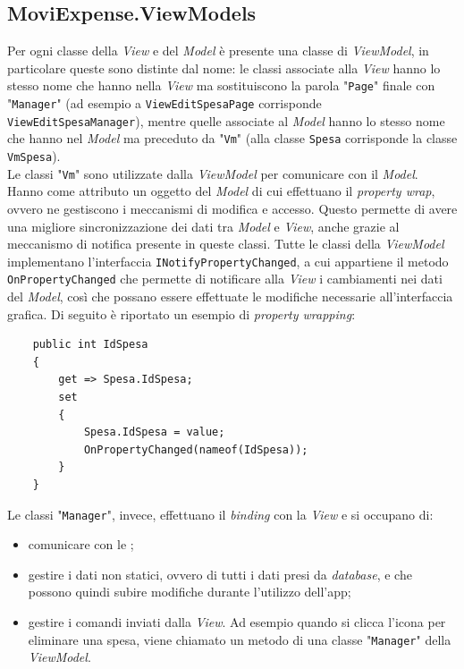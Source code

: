 \subsection{MoviExpense.ViewModels}

Per ogni classe della \textit{View} e del \textit{Model} è presente una classe di \textit{ViewModel}, in particolare queste sono distinte dal nome: le classi associate alla \textit{View} hanno lo stesso nome che hanno nella \textit{View} ma sostituiscono la parola "\texttt{Page}" finale con "\texttt{Manager}" (ad esempio a \texttt{ViewEditSpesaPage} corrisponde \texttt{ViewEditSpesaManager}), mentre quelle associate al \textit{Model} hanno lo stesso nome che hanno nel \textit{Model} ma preceduto da "\texttt{Vm}" (alla classe \texttt{Spesa} corrisponde la classe \texttt{VmSpesa}).\\
Le classi "\texttt{Vm}" sono utilizzate dalla \textit{ViewModel} per comunicare con il \textit{Model}. Hanno come attributo un oggetto del \textit{Model} di cui effettuano il \textit{property wrap}, ovvero ne gestiscono i meccanismi di modifica e accesso. Questo permette di avere una migliore sincronizzazione dei dati tra \textit{Model} e \textit{View}, anche grazie al meccanismo di notifica presente in queste classi. Tutte le classi della \textit{ViewModel} implementano l'interfaccia \texttt{INotifyPropertyChanged}, a cui appartiene il metodo \texttt{OnPropertyChanged} che permette di notificare alla \textit{View} i cambiamenti nei dati del \textit{Model}, così che possano essere effettuate le modifiche necessarie all'interfaccia grafica. Di seguito è riportato un esempio di \textit{property wrapping}:
\begin{verbatim}
    public int IdSpesa
    {
        get => Spesa.IdSpesa;
        set
        {
            Spesa.IdSpesa = value;
            OnPropertyChanged(nameof(IdSpesa));
        }
    }
\end{verbatim}

\noindent Le classi "\texttt{Manager}", invece, effettuano il \textit{binding} con la \textit{View} e si occupano di:
\begin{itemize}
    \item comunicare con le ;
    \item gestire i dati non statici, ovvero di tutti i dati presi da \textit{database}, e che possono quindi subire modifiche durante l'utilizzo dell'app;
    \item gestire i comandi inviati dalla \textit{View}. Ad esempio quando si clicca l'icona per eliminare una spesa, viene chiamato un metodo di una classe "\texttt{Manager}" della \textit{ViewModel}.
\end{itemize}


